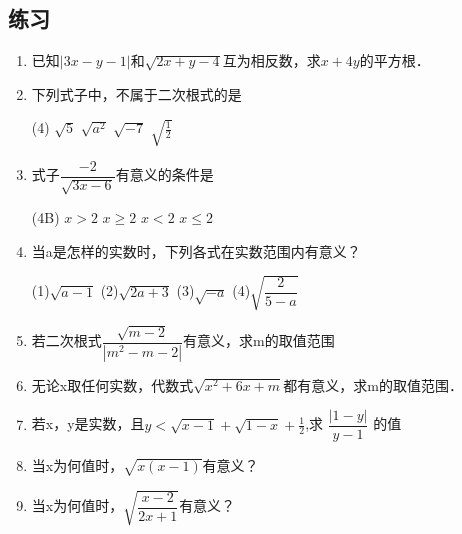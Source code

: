       \subsection{练习}
      \begin{enumerate}
       \item  已知$|3 x-y-1|$和$\sqrt{2 x+y-4}$互为相反数，求$x+4 y$的平方根．
       \item \vspace{1.7cm} 下列式子中，不属于二次根式的是
       \begin{tasks}(4)
           \task $\sqrt{5}$
           \task $\sqrt{a^{2}}$
           \task $\sqrt{-7}$
           \task $\sqrt{\frac{1}{2}}$
        \end{tasks}
           \item  式子$\dfrac{-2}{\sqrt{3 x-6}}$有意义的条件是  
    \begin{tasks}(4B)
    \task $x>2$
    \task $x \geq 2$
    \task $x<2$
    \task $x \leqslant 2$
    \end{tasks}      
       
       \item 当a是怎样的实数时，下列各式在实数范围内有意义？   \par
       (1)$\sqrt{a-1}$ \hfil (2)$\sqrt{2 a+3}$ \hfil (3)$\sqrt{-a}$ \hfil (4)$\sqrt{\dfrac{2}{5-a}}$
       \item  若二次根式$\dfrac{\sqrt{m-2}}{|m^{2}-m-2|}$有意义，求m的取值范围
        \item  \vspace{2cm}  无论x取任何实数，代数式$\sqrt{x^{2}+6 x+m}$都有意义，求m的取值范围．
        \item \vspace{2cm}  若x，y是实数，且$y<\sqrt{x-1}+\sqrt{1-x}+\frac{1}{2}$,求 $\dfrac{|1-y|}{y-1}$       的值
        \item \vspace{2cm}  当x为何值时，$\sqrt{x(x-1)}$有意义？
        \item \vspace{2cm}  当x为何值时，$\sqrt{\dfrac{x-2}{2 x+1}}$有意义？
    \end{enumerate}
      

                     



